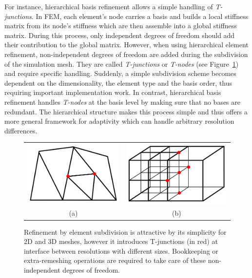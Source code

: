 For instance, hierarchical basis refinement allows a simple handling of \emph{T-junctions}.
In FEM, each element's node carries a basis and builds a local stiffness matrix from its node's stiffness which are then assemble into a global stiffness matrix.
During this process, only independent degrees of freedom should add their contribution to the global matrix. However, when using hierarchical element refinement, non-independent degrees of freedom are added during the subdivision of the simulation mesh. They are called \emph{T-junctions} or \emph{T-nodes} (see Figure~\ref{fig:tjunctions}) and require specific handling. Suddenly, a simple subdivision scheme becomes dependent on the dimensionality, the element type and the basis order, thus requiring important implementation work. In contrast, hierarchical basis refinement handles \emph{T-nodes} at the basis level by making sure that no bases are redundant. The hierarchical structure makes this process simple and thus offers a more general framework for adaptivity which can handle arbitrary resolution differences.
\begin{figure}[!h]
	\centering
	\begin{tabular}{cc}
		\includegraphics[width=0.35\linewidth]{images/starAdaptivity-cgf2016/tjunction-triangle.png} &
		\includegraphics[width=0.35\linewidth]{images/starAdaptivity-cgf2016/tjunction-grid.png} \\
		(a) & (b)
	\end{tabular}
	\caption[STAR adaptivity: T-junction]{\label{fig:tjunctions} Refinement by element subdivision is attractive by its simplicity for 2D and 3D meshes, however it introduces T-junctions (in red) at interface between resolutions with different sizes. Bookkeeping or extra-remeshing operations are required to take care of these non-independent degrees of freedom.}
\end{figure}

